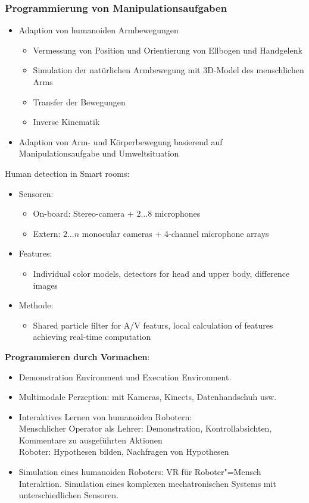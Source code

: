 \subsubsection{Programmierung von Manipulationsaufgaben}
\begin{itemize}
	\item Adaption von humanoiden Armbewegungen
	\begin{itemize}
		\item Vermessung von Position und Orientierung von Ellbogen und Handgelenk
		\item Simulation der natürlichen Armbewegung mit 3D-Model des menschlichen Arms
		\item Transfer der Bewegungen
		\item Inverse Kinematik
	\end{itemize}
	\item Adaption von Arm- und Körperbewegung basierend auf Manipulationsaufgabe und Umweltsituation
\end{itemize}
Human detection in Smart rooms:
\begin{itemize}
	\item Sensoren:
	\begin{itemize}
		\item On-board: Stereo-camera + $2 \ldots 8$ microphones
		\item Extern: $2 \ldots n$ monocular cameras + 4-channel microphone arrays
	\end{itemize}
	\item Features:
	\begin{itemize}
		\item Individual color models, detectors for head and upper body, difference images
	\end{itemize}
	\item Methode:
	\begin{itemize}
		\item Shared particle filter for A/V featurs, local calculation of features achieving real-time computation
	\end{itemize}
\end{itemize}
\textbf{Programmieren durch Vormachen}:
\begin{itemize}
\item Demonstration Environment und Execution Environment.
\item Multimodale Perzeption: mit Kameras, Kinects, Datenhandschuh usw.
\item Interaktives Lernen von humanoiden Robotern: \\
Menschlicher Operator als Lehrer: Demonstration, Kontrollabsichten, Kommentare zu ausgeführten Aktionen\\
Roboter: Hypothesen bilden, Nachfragen von Hypothesen
\item Simulation eines humanoiden Roboters: 
VR für Roboter"=Mensch Interaktion. Simulation eines komplexen mechatronischen Systems mit unterschiedlichen Sensoren.
\end{itemize}

